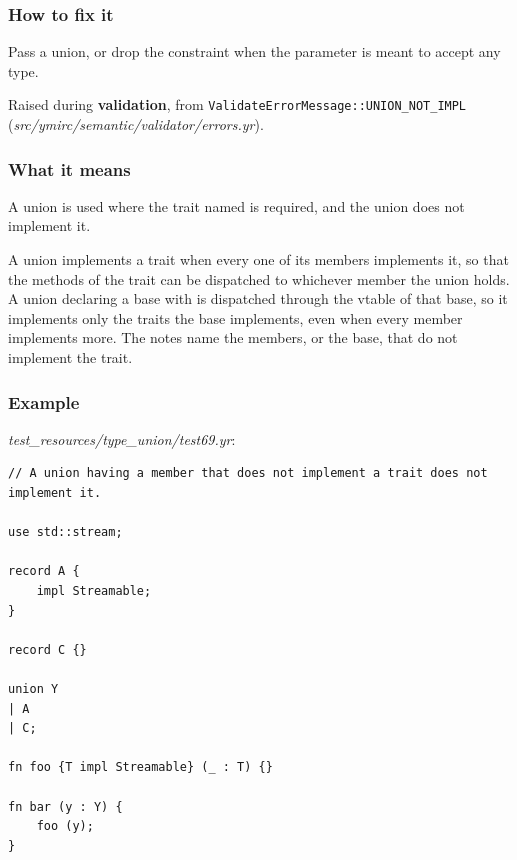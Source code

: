 \subsubsection*{How to fix it}

Pass a union, or drop the  constraint when the parameter is meant to accept any type.

\label{sec:codes:e4317}

Raised during \textbf{validation}, from \texttt{ValidateErrorMessage::\allowbreak{}UNION\_\allowbreak{}NOT\_\allowbreak{}IMPL} (\textit{src/\allowbreak{}ymirc/\allowbreak{}semantic/\allowbreak{}validator/\allowbreak{}errors.yr}).

\subsubsection*{What it means}

A union is used where the trait named is required, and the union does not implement it.

A union implements a trait when every one of its members implements it, so that the methods of the trait can be dispatched to whichever member the union holds. A union declaring a base with  is dispatched through the vtable of that base, so it implements only the traits the base implements, even when every member implements more. The notes name the members, or the base, that do not implement the trait.

\subsubsection*{Example}

\textit{test\_\allowbreak{}resources/\allowbreak{}type\_\allowbreak{}union/\allowbreak{}test69.yr}:

\begin{lstlisting}[style=coloredverbatimError]
// A union having a member that does not implement a trait does not implement it.

use std::stream;

record A {
    impl Streamable;
}

record C {}

union Y
| A
| C;

fn foo {T impl Streamable} (_ : T) {}

fn bar (y : Y) {
    foo (y);
}
\end{lstlisting}

